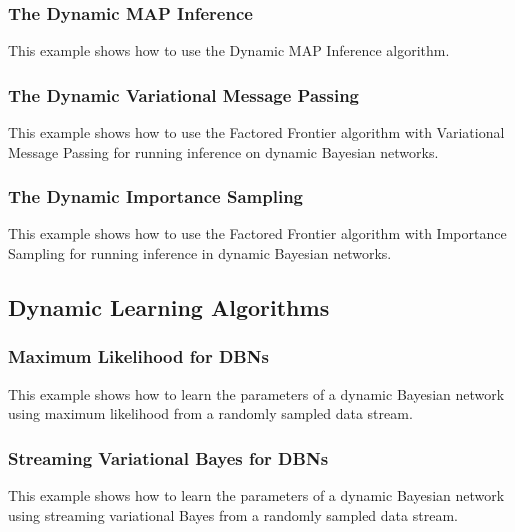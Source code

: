 \documentclass[10pt,a4paper]{article}
\begin{document}
\subsubsection{The Dynamic MAP Inference}\label{sec:dbns:inference:dmap}

This example shows how to use the Dynamic MAP Inference algorithm.



\subsubsection{The Dynamic Variational Message Passing}\label{sec:dbns:inference:dvmp}

This example shows how to use the Factored Frontier algorithm with Variational Message Passing for running inference on dynamic Bayesian networks.




\subsubsection{The Dynamic Importance Sampling}\label{sec:dbns:inference:dis}

This example shows how to use the Factored Frontier algorithm with Importance Sampling for running inference in dynamic Bayesian networks.



\subsection{Dynamic Learning Algorithms}\label{sec:dbns:learning}
\subsubsection{Maximum Likelihood for DBNs}\label{sec:dbns:learning:ml}

This example shows how to learn the parameters of a dynamic Bayesian network using maximum likelihood from a randomly sampled data stream.






\subsubsection{Streaming Variational Bayes for DBNs}\label{sec:dbns:learning:sv}

This example shows how to learn the parameters of a dynamic Bayesian network using streaming variational Bayes from a randomly sampled data stream.



\end{document}
